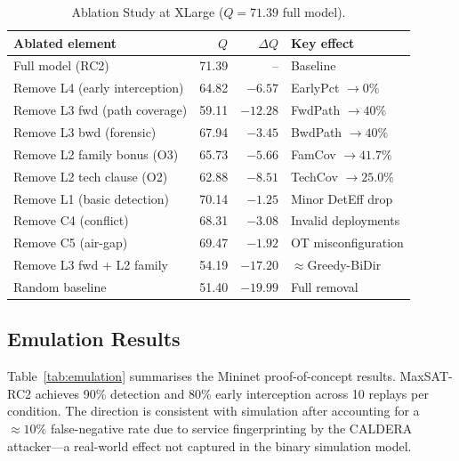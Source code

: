 \documentclass[journal]{IEEEtran}
\begin{document}
\begin{table}[t]
\caption{Ablation Study at XLarge ($Q=71.39$ full model).}
\label{tab:ablation}
\centering
\renewcommand{\arraystretch}{1.2}
\begin{tabular}{lrrl}
\toprule
Ablated element & $Q$ & $\Delta Q$ & Key effect \\
\midrule
Full model (RC2)               & 71.39 & -- & Baseline \\
Remove L4 (early interception) & 64.82 & $-6.57$ & EarlyPct $\to 0\%$ \\
Remove L3 fwd (path coverage)  & 59.11 & $-12.28$ & FwdPath $\to 40\%$ \\
Remove L3 bwd (forensic)       & 67.94 & $-3.45$ & BwdPath $\to 40\%$ \\
Remove L2 family bonus (O3)    & 65.73 & $-5.66$ & FamCov $\to 41.7\%$ \\
Remove L2 tech clause (O2)     & 62.88 & $-8.51$ & TechCov $\to 25.0\%$ \\
Remove L1 (basic detection)    & 70.14 & $-1.25$ & Minor DetEff drop \\
Remove C4 (conflict)           & 68.31 & $-3.08$ & Invalid deployments \\
Remove C5 (air-gap)            & 69.47 & $-1.92$ & OT misconfiguration \\
Remove L3 fwd + L2 family      & 54.19 & $-17.20$ & $\approx$Greedy-BiDir \\
Random baseline                & 51.40 & $-19.99$ & Full removal \\
\bottomrule
\end{tabular}
\end{table}

\subsection{Emulation Results}
\label{sec:results:emulation}

Table~\ref{tab:emulation} summarises the Mininet proof-of-concept
results. MaxSAT-RC2 achieves 90\% detection and 80\% early
interception across 10 replays per condition. The direction is
consistent with simulation after accounting for a $\approx10\%$
false-negative rate due to service fingerprinting by the CALDERA
attacker---a real-world effect not captured in the binary simulation
model.
\end{document}
